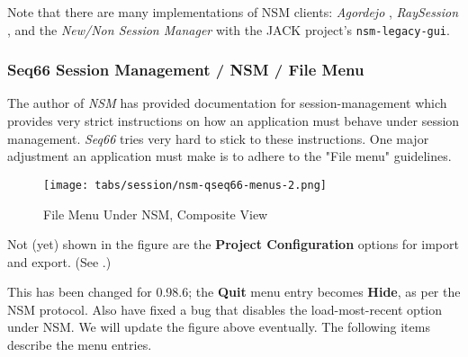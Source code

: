   Note that there are many implementations of NSM clients:
   \textsl{Agordejo} \cite{agordejo},
   \textsl{RaySession} \cite{raysession},
   and the
   \textsl{New/Non Session Manager} \cite{nsm}
   with the JACK project's \texttt{nsm-legacy-gui}.

\subsubsection{Seq66 Session Management / NSM / File Menu}
\label{subsubsec:sessions_file_menu}

   The author of \textsl{NSM} has provided documentation for session-management
   which provides very strict instructions on how an application must behave
   under session management.  \textsl{Seq66} tries very hard to stick to these
   instructions.  One major adjustment an application must make is to adhere to
   the "File menu" guidelines.

\begin{figure}[H]
   \centering 
   \texttt{[image: tabs/session/nsm-qseq66-menus-2.png]}
   \caption*{File Menu Under NSM, Composite View}
\end{figure}

   Not (yet) shown in the figure are the \textbf{Project Configuration}
   options for import and export.
   (See .)

   This has been changed for 0.98.6; the \textbf{Quit} menu entry becomes
   \textbf{Hide}, as per the NSM protocol.  Also have fixed a bug that disables
   the load-most-recent option under NSM.
   We will update the figure above eventually.
   The following items describe the menu entries.

